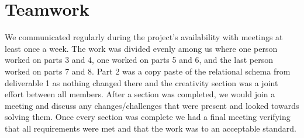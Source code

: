 \documentclass[12pt, oneside]{article}
\begin{document}
\section{Teamwork}

We communicated regularly during the project's availability with meetings at least once a week. The work was divided evenly among us where one person worked on parts 3 and 4, one worked on parts 5 and 6, and the last person worked on parts 7 and 8. Part 2 was a copy paste of the relational schema from deliverable 1 as nothing changed there and the creativity section was a joint effort between all members. After a section was completed, we would join a meeting and discuss any changes/challenges that were present and looked towards solving them. Once every section was complete we had a final meeting verifying that all requirements were met and that the work was to an acceptable standard.
\end{document}
